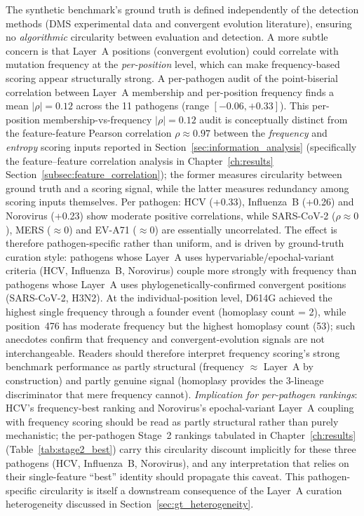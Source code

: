 The synthetic benchmark's ground truth is defined independently of the detection methods (DMS experimental data and convergent evolution literature), ensuring no \emph{algorithmic} circularity between evaluation and detection.
A more subtle concern is that Layer~A positions (convergent evolution) could correlate with mutation frequency at the \emph{per-position} level, which can make frequency-based scoring appear structurally strong. A per-pathogen audit of the point-biserial correlation between Layer~A membership and per-position frequency finds a mean $|\rho| = 0.12$ across the 11 pathogens (range $[-0.06, +0.33]$). This per-position membership-vs-frequency $|\rho|=0.12$ audit is conceptually distinct from the feature-feature Pearson correlation $\rho \approx 0.97$ between the \emph{frequency} and \emph{entropy} scoring inputs reported in Section~\ref{sec:information_analysis} (specifically the feature--feature correlation analysis in Chapter~\ref{ch:results} Section~\ref{subsec:feature_correlation}); the former measures circularity between ground truth and a scoring signal, while the latter measures redundancy among scoring inputs themselves. Per pathogen: HCV (+0.33), Influenza~B (+0.26) and Norovirus (+0.23) show moderate positive correlations, while SARS-CoV-2 ($\rho \approx 0$), MERS ($\approx 0$) and EV-A71 ($\approx 0$) are essentially uncorrelated. The effect is therefore pathogen-specific rather than uniform, and is driven by ground-truth curation style: pathogens whose Layer~A uses hypervariable/epochal-variant criteria (HCV, Influenza~B, Norovirus) couple more strongly with frequency than pathogens whose Layer~A uses phylogenetically-confirmed convergent positions (SARS-CoV-2, H3N2).
At the individual-position level, D614G achieved the highest single frequency through a founder event (homoplasy count = 2), while position~476 has moderate frequency but the highest homoplasy count (53); such anecdotes confirm that frequency and convergent-evolution signals are not interchangeable. Readers should therefore interpret frequency scoring's strong benchmark performance as partly structural (frequency $\approx$ Layer~A by construction) and partly genuine signal (homoplasy provides the 3-lineage discriminator that mere frequency cannot). \emph{Implication for per-pathogen rankings}: HCV's frequency-best ranking and Norovirus's epochal-variant Layer~A coupling with frequency scoring should be read as partly structural rather than purely mechanistic; the per-pathogen Stage~2 rankings tabulated in Chapter~\ref{ch:results} (Table~\ref{tab:stage2_best}) carry this circularity discount implicitly for these three pathogens (HCV, Influenza~B, Norovirus), and any interpretation that relies on their single-feature ``best'' identity should propagate this caveat. This pathogen-specific circularity is itself a downstream consequence of the Layer~A curation heterogeneity discussed in Section~\ref{sec:gt_heterogeneity}.
